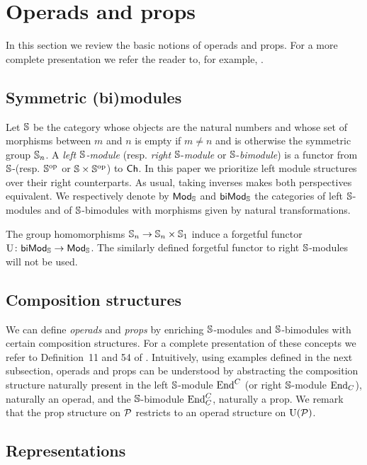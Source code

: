 
\section{Operads and props} \label{s:operads and props}

In this section we review the basic notions of operads and props.
For a more complete presentation we refer the reader to, for example, \cite{markl2008props}.

\subsection{Symmetric (bi)modules}

Let $\S$ be the category whose objects are the natural numbers and whose set of morphisms between $m$ and $n$ is empty if $m \neq n$ and is otherwise the symmetric group $\S_n$.
A \textit{left $\S$-module} (resp. \textit{right} $\S$-\textit{module} or $\S$-\textit{bimodule}) is a functor from $\S$-(resp. $\S^\op$ or $\S \times \S^\op$) to $\Ch$.
In this paper we prioritize left module structures over their right counterparts. As usual, taking inverses makes both perspectives equivalent.
We respectively denote by $\smod$ and $\sbimod$ the categories of left $\S$-modules and of $\S$-bimodules with morphisms given by natural transformations.

The group homomorphisms $\S_n \to \S_n \times \S_1$ induce a forgetful functor $\forget \colon \sbimod \to \smod$.
The similarly defined forgetful functor to right $\S$-modules will not be used.

\subsection{Composition structures}

We can define \textit{operads} and \textit{props} by enriching $\S$-modules and $\S$-bimodules with certain composition structures.
For a complete presentation of these concepts we refer to Definition~11 and 54 of \cite{markl2008props}.
Intuitively, using examples defined in the next subsection, operads and props can be understood by abstracting the composition structure naturally present in the left $\S$-module $\End^C$ (or right $\S$-module $\End_C$), naturally an operad, and the $\S$-bimodule $\End^C_C$, naturally a prop.
We remark that the prop structure on $\P$ restricts to an operad structure on $\forget(\P)$.

\subsection{Representations}

